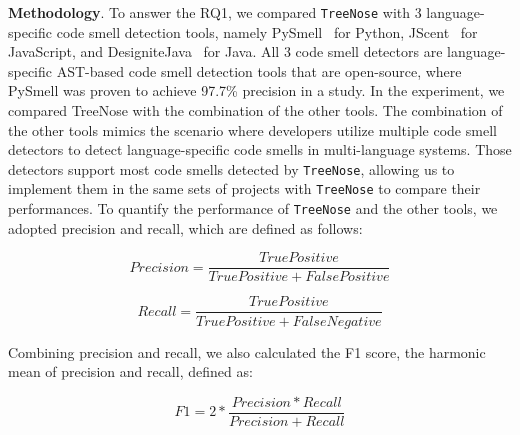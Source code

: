 



{\bf Methodology}. To answer the RQ1, we compared \texttt{TreeNose} with 3
language-specific code smell detection tools, namely PySmell~\cite{Pysmell} for
Python, JScent~\cite{Jscent} for JavaScript, and
DesigniteJava~\cite{DesigniteJava} for Java. All 3 code smell detectors are
language-specific AST-based code smell detection tools that are open-source,
where PySmell was proven to achieve 97.7\% precision in a study. In the
experiment, we compared TreeNose with the combination of the other tools. The
combination of the other tools mimics the scenario where developers utilize
multiple code smell detectors to detect language-specific code smells in
multi-language systems. Those detectors support most code smells detected by
\texttt{TreeNose}, allowing us to implement them in the same sets of projects
with \texttt{TreeNose} to compare their performances. To quantify the
performance of \texttt{TreeNose} and the other tools, we adopted precision and
recall, which are defined as follows:

\vspace{-1.25em}

\begin{equation}
    Precision = \frac{True Positive}{True Positive + False Positive}
\end{equation}

\begin{equation}
    Recall = \frac{True Positive}{True Positive + False Negative}
\end{equation}

Combining precision and recall, we also calculated the F1 score, the harmonic
mean of precision and recall, defined as:

\vspace{-0.5em}

\begin{equation}
    F1 = 2 * \frac{Precision * Recall}{Precision + Recall}
\end{equation}


